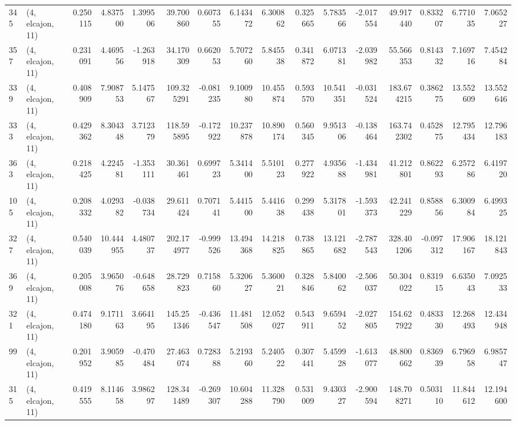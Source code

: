 \begin{tabular}{llrrrrrrrrrrrrrr}
345 &  (4, elcajon, 11) &   0.250115 &   4.837500 &   1.399506 &    39.700860 &   0.607355 &   6.143472 &   6.300862 &  0.325665 &   5.783566 &  -2.017554 &     49.917440 &    0.833207 &    6.771035 &    7.065227 \\
357 &  (4, elcajon, 11) &   0.231091 &   4.469556 &  -1.263918 &    34.170309 &   0.662053 &   5.707260 &   5.845538 &  0.341872 &   6.071381 &  -2.039982 &     55.566353 &    0.814332 &    7.169716 &    7.454284 \\
339 &  (4, elcajon, 11) &   0.408909 &   7.908753 &   5.147567 &   109.325291 &  -0.081235 &   9.100980 &  10.455874 &  0.593570 &  10.541351 &  -0.031524 &    183.674215 &    0.386275 &   13.552609 &   13.552646 \\
333 &  (4, elcajon, 11) &   0.429362 &   8.304348 &   3.712379 &   118.595895 &  -0.172922 &  10.237878 &  10.890174 &  0.560345 &   9.951306 &  -0.138464 &    163.742302 &    0.452875 &   12.795434 &   12.796183 \\
363 &  (4, elcajon, 11) &   0.218425 &   4.224581 &  -1.353111 &    30.361461 &   0.699723 &   5.341400 &   5.510123 &  0.277922 &   4.935688 &  -1.434981 &     41.212801 &    0.862293 &    6.257286 &    6.419720 \\
105 &  (4, elcajon, 11) &   0.208332 &   4.029382 &  -0.038734 &    29.611424 &   0.707141 &   5.441500 &   5.441638 &  0.299438 &   5.317801 &  -1.593373 &     42.241229 &    0.858856 &    6.300984 &    6.499325 \\
327 &  (4, elcajon, 11) &   0.540039 &  10.444955 &   4.480737 &   202.174977 &  -0.999526 &  13.494368 &  14.218825 &  0.738865 &  13.121682 &  -2.787543 &    328.401206 &   -0.097312 &   17.906167 &   18.121843 \\
369 &  (4, elcajon, 11) &   0.205008 &   3.965076 &  -0.648658 &    28.729823 &   0.715860 &   5.320627 &   5.360021 &  0.328846 &   5.840062 &  -2.506037 &     50.304022 &    0.831915 &    6.635043 &    7.092533 \\
321 &  (4, elcajon, 11) &   0.474180 &   9.171163 &   3.664195 &   145.251346 &  -0.436547 &  11.481508 &  12.052027 &  0.543911 &   9.659452 &  -2.027805 &    154.627922 &    0.483330 &   12.268493 &   12.434948 \\
99  &  (4, elcajon, 11) &   0.201952 &   3.905985 &  -0.470484 &    27.463074 &   0.728388 &   5.219360 &   5.240522 &  0.307441 &   5.459928 &  -1.613077 &     48.800662 &    0.836939 &    6.796958 &    6.985747 \\
315 &  (4, elcajon, 11) &   0.419555 &   8.114658 &   3.986297 &   128.341489 &  -0.269307 &  10.604288 &  11.328790 &  0.531009 &   9.430327 &  -2.900594 &    148.708271 &    0.503110 &   11.844612 &   12.194600 \\

\end{tabular}
